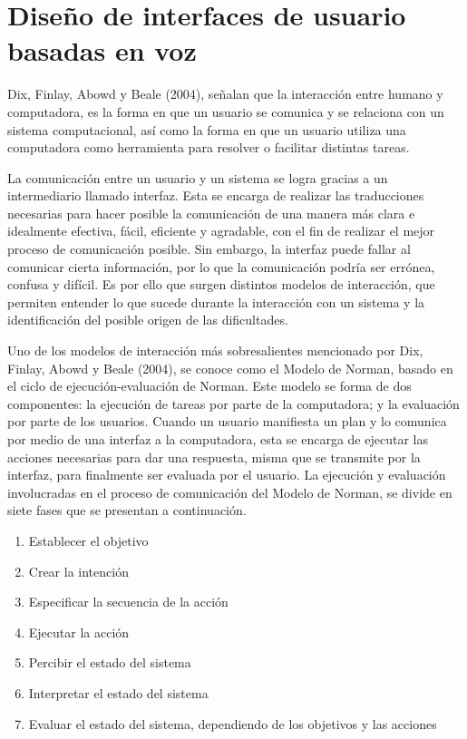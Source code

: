 
\chapter{Diseño de interfaces de usuario basadas en voz}
\label{capIII}

Dix, Finlay, Abowd y Beale (2004), señalan que la interacción entre humano y computadora, es la forma en que un usuario se comunica y se relaciona con un sistema computacional, así como la forma en que un usuario utiliza una computadora como herramienta para resolver o facilitar distintas tareas.

La comunicación entre un usuario y un sistema se logra gracias a un intermediario llamado interfaz. Esta se encarga de realizar las traducciones necesarias para hacer posible la comunicación de una manera más clara e idealmente efectiva, fácil, eficiente y agradable, con el fin de realizar el mejor proceso de comunicación posible. Sin embargo, la interfaz puede fallar al comunicar cierta información, por lo que la comunicación podría ser errónea, confusa y difícil. Es por ello que surgen distintos modelos de interacción, que permiten entender lo que sucede durante la interacción con un sistema y la identificación del posible origen de las dificultades.

Uno de los modelos de interacción más sobresalientes mencionado por Dix, Finlay, Abowd y Beale (2004), se conoce como el Modelo de Norman, basado en el ciclo de ejecución-evaluación de Norman. Este modelo se forma de dos componentes: la ejecución de tareas por parte de la computadora; y la evaluación por parte de los usuarios. Cuando un usuario manifiesta un plan y lo comunica por medio de una interfaz a la computadora, esta se encarga de ejecutar las acciones necesarias para dar una respuesta, misma que se transmite por la interfaz, para finalmente ser evaluada por el usuario. La ejecución  y evaluación involucradas en el proceso de comunicación del Modelo de Norman, se divide en siete fases que se presentan a continuación.

\begin{enumerate}
  \item Establecer el objetivo
  \item Crear la intención
  \item Especificar la secuencia de la acción
  \item Ejecutar la acción
  \item Percibir el estado del sistema
  \item Interpretar el estado del sistema
  \item Evaluar el estado del sistema, dependiendo de los objetivos y las acciones
\end{enumerate}

